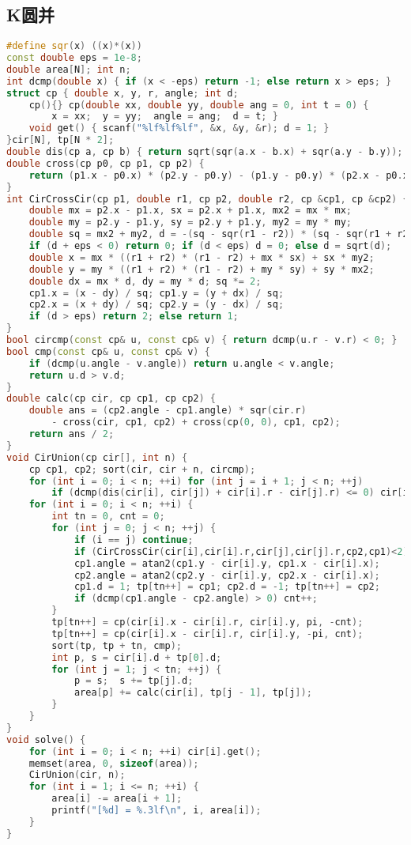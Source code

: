 \documentclass[landscape,a4paper]{article}
\begin{document}
\subsection{K圆并}
\begin{lstlisting}[language=C++]
#define sqr(x) ((x)*(x))
const double eps = 1e-8;
double area[N]; int n;
int dcmp(double x) { if (x < -eps) return -1; else return x > eps; }
struct cp { double x, y, r, angle; int d;
	cp(){} cp(double xx, double yy, double ang = 0, int t = 0) {
		x = xx;  y = yy;  angle = ang;  d = t; }
	void get() { scanf("%lf%lf%lf", &x, &y, &r); d = 1; }
}cir[N], tp[N * 2];
double dis(cp a, cp b) { return sqrt(sqr(a.x - b.x) + sqr(a.y - b.y)); }
double cross(cp p0, cp p1, cp p2) {
	return (p1.x - p0.x) * (p2.y - p0.y) - (p1.y - p0.y) * (p2.x - p0.x); 
}
int CirCrossCir(cp p1, double r1, cp p2, double r2, cp &cp1, cp &cp2) {
    double mx = p2.x - p1.x, sx = p2.x + p1.x, mx2 = mx * mx;
    double my = p2.y - p1.y, sy = p2.y + p1.y, my2 = my * my;
    double sq = mx2 + my2, d = -(sq - sqr(r1 - r2)) * (sq - sqr(r1 + r2));
    if (d + eps < 0) return 0; if (d < eps) d = 0; else d = sqrt(d);
    double x = mx * ((r1 + r2) * (r1 - r2) + mx * sx) + sx * my2;
    double y = my * ((r1 + r2) * (r1 - r2) + my * sy) + sy * mx2;
    double dx = mx * d, dy = my * d; sq *= 2;
    cp1.x = (x - dy) / sq; cp1.y = (y + dx) / sq;
    cp2.x = (x + dy) / sq; cp2.y = (y - dx) / sq;
    if (d > eps) return 2; else return 1;
}
bool circmp(const cp& u, const cp& v) { return dcmp(u.r - v.r) < 0; }
bool cmp(const cp& u, const cp& v) {
    if (dcmp(u.angle - v.angle)) return u.angle < v.angle;
    return u.d > v.d;
}
double calc(cp cir, cp cp1, cp cp2) {
    double ans = (cp2.angle - cp1.angle) * sqr(cir.r)
        - cross(cir, cp1, cp2) + cross(cp(0, 0), cp1, cp2);
    return ans / 2;
}
void CirUnion(cp cir[], int n) {
    cp cp1, cp2; sort(cir, cir + n, circmp);
    for (int i = 0; i < n; ++i) for (int j = i + 1; j < n; ++j)
        if (dcmp(dis(cir[i], cir[j]) + cir[i].r - cir[j].r) <= 0) cir[i].d++;
	for (int i = 0; i < n; ++i) {
		int tn = 0, cnt = 0;
		for (int j = 0; j < n; ++j) {
			if (i == j) continue;
            if (CirCrossCir(cir[i],cir[i].r,cir[j],cir[j].r,cp2,cp1)<2) continue;
            cp1.angle = atan2(cp1.y - cir[i].y, cp1.x - cir[i].x);
            cp2.angle = atan2(cp2.y - cir[i].y, cp2.x - cir[i].x);
            cp1.d = 1; tp[tn++] = cp1; cp2.d = -1; tp[tn++] = cp2;
            if (dcmp(cp1.angle - cp2.angle) > 0) cnt++;
        }
        tp[tn++] = cp(cir[i].x - cir[i].r, cir[i].y, pi, -cnt);
        tp[tn++] = cp(cir[i].x - cir[i].r, cir[i].y, -pi, cnt);
        sort(tp, tp + tn, cmp);
        int p, s = cir[i].d + tp[0].d;
        for (int j = 1; j < tn; ++j) {
            p = s;  s += tp[j].d;
            area[p] += calc(cir[i], tp[j - 1], tp[j]);
        }
    }
}
void solve() {
    for (int i = 0; i < n; ++i) cir[i].get();
    memset(area, 0, sizeof(area));
    CirUnion(cir, n);
    for (int i = 1; i <= n; ++i) {
        area[i] -= area[i + 1];
        printf("[%d] = %.3lf\n", i, area[i]);
    }
}
\end{lstlisting}
\end{document}
